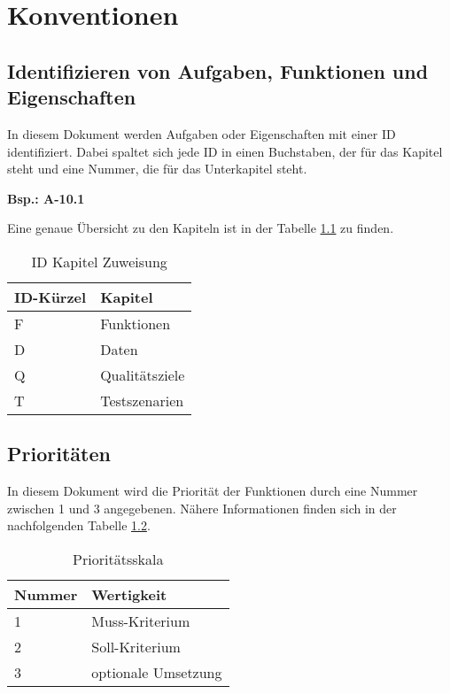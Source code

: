
\chapter{Konventionen}
\section{Identifizieren von Aufgaben, Funktionen und Eigenschaften}
In diesem Dokument werden Aufgaben oder Eigenschaften mit einer ID identifiziert.
Dabei spaltet sich jede ID in einen Buchstaben, der für das Kapitel steht und eine Nummer, die für das Unterkapitel steht.\\
\begin{center}
    \textbf{Bsp.: A-10.1}
\end{center}
Eine genaue Übersicht zu den Kapiteln ist in der Tabelle \ref{einleitung:kapitel} zu finden.
\begin{table}[H]
    \caption{ID Kapitel Zuweisung}
    \label{einleitung:kapitel}
    \begin{tabularx}{\textwidth}{|l|X|}
        \toprule
        \textbf{ID-Kürzel} & \textbf{Kapitel} \\
        \endhead
        \hline
        F & Funktionen \\
        D & Daten \\
        Q & Qualitätsziele \\
        T & Testszenarien \\
        \hline
    \end{tabularx}
\end{table}

\section{Prioritäten}
In diesem Dokument wird die Priorität der Funktionen durch eine Nummer zwischen 1 und 3 angegebenen. Nähere Informationen finden sich in der nachfolgenden Tabelle \ref{einleitung:priority}.
\begin{table}[H]
    \caption{Prioritätsskala}
    \label{einleitung:priority}
    \begin{tabularx}{\textwidth}{|l|X|}
        \toprule
        \textbf{Nummer} & \textbf{Wertigkeit}\\
        \endhead
        \hline
        1 & Muss-Kriterium\\
        2 & Soll-Kriterium\\
        3 & optionale Umsetzung\\
        \hline
    \end{tabularx}
\end{table}
